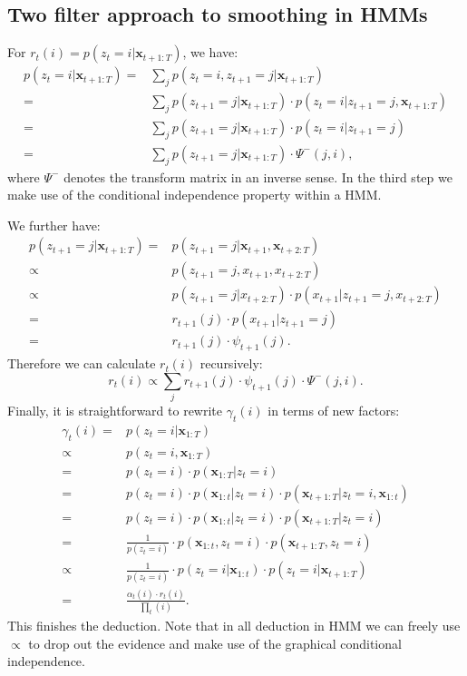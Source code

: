 \documentclass[UTF8]{ctexart}
\begin{document}
\subsection{Two filter approach to smoothing in HMMs}
For $r_{t}(i)=p(z_{t}=i|\textbf{x}_{t+1:T})$, we have:
\begin{align}
p(z_{t}=i|\textbf{x}_{t+1:T})=&\sum_{j}p(z_{t}=i,z_{t+1}=j|\textbf{x}_{t+1:T}) \nonumber \\
=&\sum_{j}p(z_{t+1}=j|\textbf{x}_{t+1:T})\cdot p(z_{t}=i|z_{t+1}=j,\textbf{x}_{t+1:T}) \nonumber \\
=&\sum_{j}p(z_{t+1}=j|\textbf{x}_{t+1:T})\cdot p(z_{t}=i|z_{t+1}=j) \nonumber \\
=&\sum_{j}p(z_{t+1}=j|\textbf{x}_{t+1:T})\cdot \Psi^{-}(j,i), \nonumber
\end{align}
where $\Psi^{-}$ denotes the transform matrix in an inverse sense.
In the third step we make use of the conditional independence property within a HMM.

We further have:
\begin{align}
p(z_{t+1}=j|\textbf{x}_{t+1:T})=&p(z_{t+1}=j|\textbf{x}_{t+1},\textbf{x}_{t+2:T}) \nonumber \\
\propto&p(z_{t+1}=j,x_{t+1},x_{t+2:T}) \nonumber \\
\propto&p(z_{t+1}=j|x_{t+2:T})\cdot p(x_{t+1}|z_{t+1}=j,x_{t+2:T}) \nonumber \\
=& r_{t+1}(j)\cdot p(x_{t+1}|z_{t+1}=j)\nonumber\\
=& r_{t+1}(j)\cdot \psi_{t+1}(j). \nonumber
\end{align}
Therefore we can calculate $r_{t}(i)$ recursively:
$$r_{t}(i)\propto \sum_{j}r_{t+1}(j)\cdot\psi_{t+1}(j)\cdot\Psi^{-}(j,i).$$
Finally, it is straightforward to rewrite $\gamma_{t}(i)$ in terms of new factors:
\begin{align}
\gamma_{t}(i)=&p(z_{t}=i|\textbf{x}_{1:T})\nonumber \\
\propto& p(z_{t}=i,\textbf{x}_{1:T}) \nonumber \\
=&p(z_{t}=i)\cdot p(\textbf{x}_{1:T}|z_{t}=i)\nonumber \\
=&p(z_{t}=i)\cdot p(\textbf{x}_{1:t}|z_{t}=i)\cdot p(\textbf{x}_{t+1:T}|z_{t}=i,\textbf{x}_{1:t}) \nonumber \\
=&p(z_{t}=i)\cdot p(\textbf{x}_{1:t}|z_{t}=i)\cdot p(\textbf{x}_{t+1:T}|z_{t}=i) \nonumber \\
=&\frac{1}{p(z_{t}=i)}\cdot p(\textbf{x}_{1:t},z_{t}=i)\cdot p(\textbf{x}_{t+1:T},z_{t}=i) \nonumber \\
\propto&\frac{1}{p(z_{t}=i)}\cdot p(z_{t}=i|\textbf{x}_{1:t})\cdot p(z_{t}=i|\textbf{x}_{t+1:T}) \nonumber \\
=&\frac{\alpha_{t}(i)\cdot r_{t}(i)}{\prod_{t}(i)}. \nonumber
\end{align}
This finishes the deduction. 
Note that in all deduction in HMM we can freely use $\propto$ to drop out the evidence and make use of the graphical conditional independence.
\end{document}

